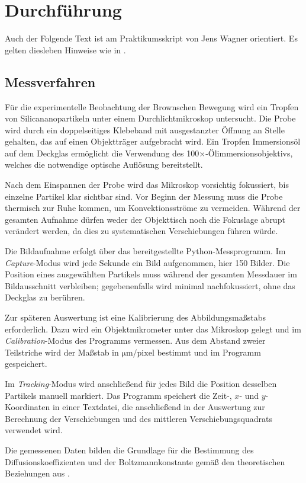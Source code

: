 \chapter{Durchführung} \label{ch:Durchfuehrung}

Auch der Folgende Text ist am Praktikumsskript von Jens Wagner orientiert. Es gelten diesleben Hinweise wie in .\cite{skriptPAP21,Duden}


\section{Messverfahren} \label{sec:Messverfahren}

Für die experimentelle Beobachtung der Brownschen Bewegung wird ein Tropfen von Silicananopartikeln unter einem Durchlichtmikroskop untersucht. Die Probe wird durch ein doppelseitiges Klebeband mit ausgestanzter Öffnung an Stelle gehalten, das auf einen Objektträger aufgebracht wird. Ein Tropfen Immersionsöl auf dem Deckglas ermöglicht die Verwendung des 100\(\times\)-Ölimmersionsobjektivs, welches die notwendige optische Auflösung bereitstellt.

Nach dem Einspannen der Probe wird das Mikroskop vorsichtig fokussiert, bis einzelne Partikel klar sichtbar sind. Vor Beginn der Messung muss die Probe thermisch zur Ruhe kommen, um Konvektionsströme zu vermeiden. Während der gesamten Aufnahme dürfen weder der Objekttisch noch die Fokuslage abrupt verändert werden, da dies zu systematischen Verschiebungen führen würde.

Die Bildaufnahme erfolgt über das bereitgestellte Python-Messprogramm. Im \emph{Capture}-Modus wird jede Sekunde ein Bild aufgenommen, hier 150 Bilder. Die Position eines ausgewählten Partikels muss während der gesamten Messdauer im Bildausschnitt verbleiben; gegebenenfalls wird minimal nachfokussiert, ohne das Deckglas zu berühren.

Zur späteren Auswertung ist eine Kalibrierung des Abbildungsmaßstabs erforderlich. Dazu wird ein Objektmikrometer unter das Mikroskop gelegt und im \emph{Calibration}-Modus des Programms vermessen. Aus dem Abstand zweier Teilstriche wird der Maßstab in \(\mathrm{\mu m/pixel}\) bestimmt und im Programm gespeichert.

Im \emph{Tracking}-Modus wird anschließend für jedes Bild die Position desselben Partikels manuell markiert. Das Programm speichert die Zeit-, \(x\)- und \(y\)-Koordinaten in einer Textdatei, die anschließend in der Auswertung zur Berechnung der Verschiebungen und des mittleren Verschiebungsquadrats verwendet wird.

Die gemessenen Daten bilden die Grundlage für die Bestimmung des Diffusionskoeffizienten und der Boltzmannkonstante gemäß den theoretischen Beziehungen aus .

